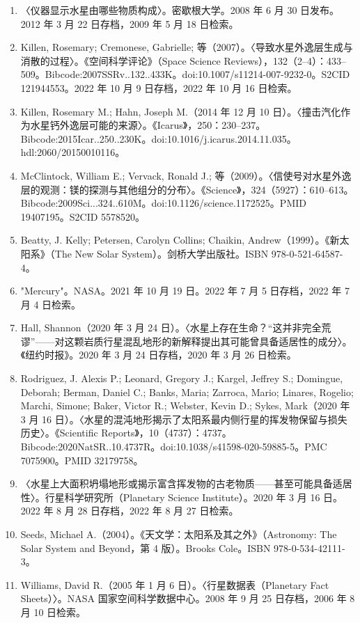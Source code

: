 \begin{enumerate}
    \item 〈仪器显示水星由哪些物质构成〉。密歇根大学。2008 年 6 月 30 日发布。2012 年 3 月 22 日存档，2009 年 5 月 18 日检索。
    \item Killen, Rosemary; Cremonese, Gabrielle; 等（2007）。〈导致水星外逸层生成与消散的过程〉。《空间科学评论》（Space Science Reviews），132（2–4）：433–509。Bibcode:2007SSRv..132..433K。doi:10.1007/s11214-007-9232-0。S2CID 121944553。2022 年 10 月 9 日存档，2022 年 10 月 16 日检索。
    \item Killen, Rosemary M.; Hahn, Joseph M.（2014 年 12 月 10 日）。〈撞击汽化作为水星钙外逸层可能的来源〉。《Icarus》，250：230–237。Bibcode:2015Icar..250..230K。doi:10.1016/j.icarus.2014.11.035。hdl:2060/20150010116。
    \item McClintock, William E.; Vervack, Ronald J.; 等（2009）。〈信使号对水星外逸层的观测：镁的探测与其他组分的分布〉。《Science》，324（5927）：610–613。Bibcode:2009Sci...324..610M。doi:10.1126/science.1172525。PMID 19407195。S2CID 5578520。
    \item Beatty, J. Kelly; Petersen, Carolyn Collins; Chaikin, Andrew（1999）。《新太阳系》（The New Solar System）。剑桥大学出版社。ISBN 978-0-521-64587-4。
    \item "Mercury"。NASA。2021 年 10 月 19 日。2022 年 7 月 5 日存档，2022 年 7 月 4 日检索。
    \item Hall, Shannon（2020 年 3 月 24 日）。〈水星上存在生命？“这并非完全荒谬”——对这颗岩质行星混乱地形的新解释提出其可能曾具备适居性的成分〉。《纽约时报》。2020 年 3 月 24 日存档，2020 年 3 月 26 日检索。
    \item Rodriguez, J. Alexis P.; Leonard, Gregory J.; Kargel, Jeffrey S.; Domingue, Deborah; Berman, Daniel C.; Banks, Maria; Zarroca, Mario; Linares, Rogelio; Marchi, Simone; Baker, Victor R.; Webster, Kevin D.; Sykes, Mark（2020 年 3 月 16 日）。〈水星的混沌地形揭示了太阳系最内侧行星的挥发物保留与损失历史〉。《Scientific Reports》，10（4737）：4737。Bibcode:2020NatSR..10.4737R。doi:10.1038/s41598-020-59885-5。PMC 7075900。PMID 32179758。
    \item 〈水星上大面积坍塌地形或揭示富含挥发物的古老物质——甚至可能具备适居性〉。行星科学研究所（Planetary Science Institute）。2020 年 3 月 16 日。2022 年 8 月 28 日存档，2022 年 8 月 27 日检索。
    \item Seeds, Michael A.（2004）。《天文学：太阳系及其之外》（Astronomy: The Solar System and Beyond，第 4 版）。Brooks Cole。ISBN 978-0-534-42111-3。
    \item Williams, David R.（2005 年 1 月 6 日）。〈行星数据表（Planetary Fact Sheets）〉。NASA 国家空间科学数据中心。2008 年 9 月 25 日存档，2006 年 8 月 10 日检索。

\end{enumerate}

